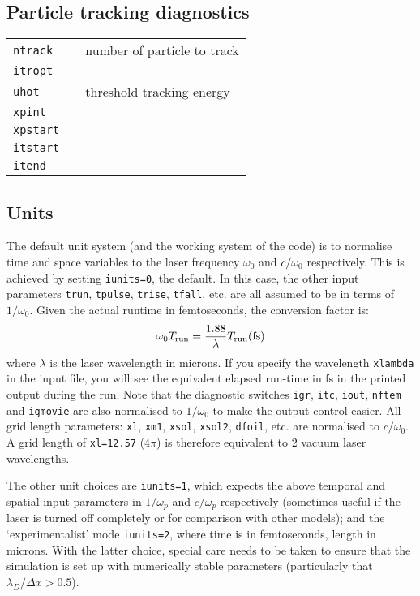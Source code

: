 \documentclass[11pt]{article}
\newcommand{\downbox}[1]{_{\mbox{\scriptsize\rm #1}}}
\begin{document}
\subsection{Particle tracking diagnostics}
\begin{tabular}{lrl} 
\texttt{ntrack} & & number of particle to track \\
\texttt{itropt} & & \\
\texttt{uhot} & & threshold tracking energy \\
\texttt{xpint} & & \\
\texttt{xpstart} & & \\
\texttt{itstart} & & \\
\texttt{itend} & & 
\end{tabular}





\subsection{Units} 
 The default unit system (and the working system of the code) is to normalise time and space variables 
to the laser frequency $\omega_0$ and $c/\omega_0$ respectively. This is achieved by setting \texttt{iunits=0}, the default.  In this case, the other input parameters \texttt{trun}, \texttt{tpulse}, \texttt{trise}, \texttt{tfall}, etc. are all assumed to be in terms of $1/\omega_0$. Given the actual runtime in femtoseconds, the conversion factor is: 
 $$\omega_0 T\downbox{run} = \frac{1.88}{\lambda} T\downbox{run} \mbox{(fs)} $$
where $\lambda$ is the laser wavelength in microns. If you specify the wavelength \texttt{xlambda} in the input file, you will see the 
equivalent elapsed run-time in fs in the printed output during the run. Note that the diagnostic switches \texttt{igr}, \texttt{itc}, \texttt{iout}, \texttt{nftem} 
and \texttt{igmovie} are also normalised to $1/\omega_0$ to make the output control easier. 
All grid length parameters: \texttt{xl}, \texttt{xm1}, \texttt{xsol}, \texttt{xsol2}, \texttt{dfoil}, etc. are normalised to $c/\omega_0$. A grid length of \texttt{xl=12.57} ($4\pi$) is therefore equivalent to 2 vacuum laser wavelengths. 

The other unit choices are \texttt{iunits=1}, which expects the above temporal and spatial input parameters
 in  $1/\omega_p$ and $c/\omega_p$ respectively (sometimes useful if the laser is turned off completely or for
 comparison with other models); and the `experimentalist' mode \texttt{iunits=2}, where time is in femtoseconds,
 length in microns.  With the latter choice, special care needs to be taken to ensure that the simulation is
set up with numerically stable parameters (particularly that $\lambda_D/\Delta x>0.5$).
\end{document}
